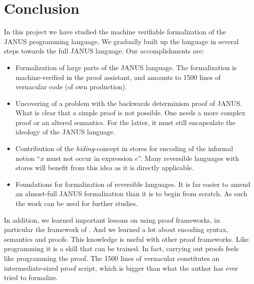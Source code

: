 \chapter{Conclusion}


In this project we have studied the machine verifiable formalization
of the JANUS programming language. We gradually built up the language
in several steps towards the full JANUS language. Our accomplishments are:
\begin{itemize}
\item Formalization of large parts of the JANUS language. The
  formalization is machine-verified in the \coq{} proof assistant, and
  amounts to 1500 lines of vernacular code (of own production).
\item Uncovering of a problem with the backwards determinism proof of
  JANUS. What is clear that a simple proof is not possible. One needs
  a more complex proof or an altered semantics. For the latter, it
  must still encapsulate the ideology of the JANUS language.
\item Contribution of the \emph{hiding}-concept in stores for encoding
  of the informal notion ``$x$ must not occur in expression $e$''. Many
  reversible languages with stores will benefit from this idea as it
  is directly applicable.
\item Foundations for formalization of reversible languages. It is far
  easier to amend an almost-full JANUS formalization than it is to
  begin from scratch. As such the work can be used for further studies.
\end{itemize}

In addition, we learned important lessons on using proof frameworks,
in particular the framework of \coq{}. And we learned a lot about
encoding syntax, semantics and proofs. This knowledge is useful with
other proof frameworks. Like programming it is a skill that can be
trained. In fact, carrying out proofs feels like programming the
proof. The 1500 lines of vernacular constitutes an intermediate-sized
proof script, which is bigger than what the author has ever tried to
formalize.

